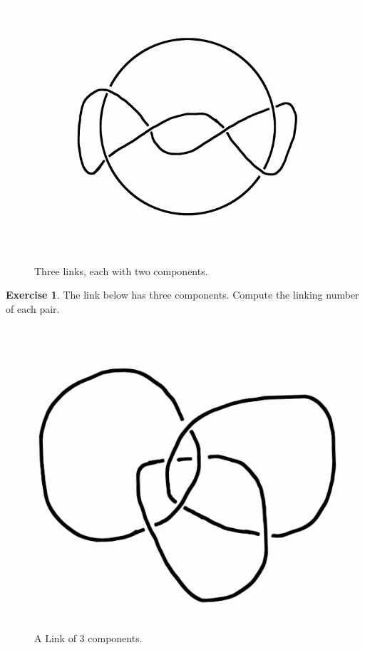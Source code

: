 \documentclass[12pt,letterpaper]{article}
\theoremstyle{definition}
\newtheorem{exercise}[question]{Exercise}
\begin{document}
\begin{figure}[h]
\begin{subfigure}{.3\textwidth}
    \end{subfigure}
    \quad
    \begin{subfigure}{.3\textwidth}
        \centering
        \includegraphics[width=\textwidth]{rgp11pics/ex3.png}
    \end{subfigure}
    \caption{Three links, each with two components.}
\end{figure}
    
\begin{exercise}
The link below has three components.
Compute the linking number of each pair.
\end{exercise}

\begin{figure}[h]
    \centering
    \includegraphics[width=.5\textwidth]{rgp11pics/hitchmantriple.png}
    \caption{A Link of 3 components.}
\end{figure}
\end{document}
